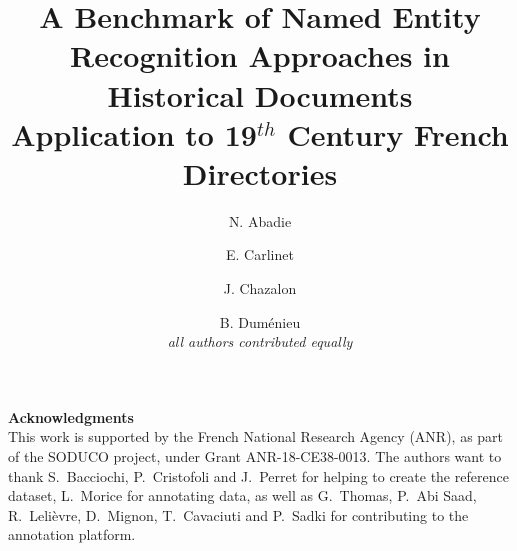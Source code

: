 \documentclass[runningheads,svgnames]{llncs}
\begin{document}
%
\title{A Benchmark of Named Entity Recognition Approaches in Historical Documents\\
Application to 19$^{th}$ Century French Directories%
}
%
%
\author{%
N. Abadie \and
E. Carlinet \and
J. Chazalon \and
B. Duménieu\\
{\footnotesize \emph{all authors contributed equally}}%
}
%
%
%
\maketitle              %
%
\begin{abstract}

\end{abstract}







\newpage


\bigskip
\noindent\textbf{Acknowledgments}\\
{
\footnotesize
This work is supported by the French National Research Agency (ANR), as part of the SODUCO project, under Grant ANR-18-CE38-0013.
%
The authors want to thank S.~Bacciochi, P.~Cristofoli and J.~Perret for helping to create the reference dataset, 
L.~Morice for annotating data,
as well as G.~Thomas, P.~Abi Saad, R.~Lelièvre, D.~Mignon, T.~Cavaciuti and P.~Sadki for contributing to the annotation platform.
}
%



\end{document}
